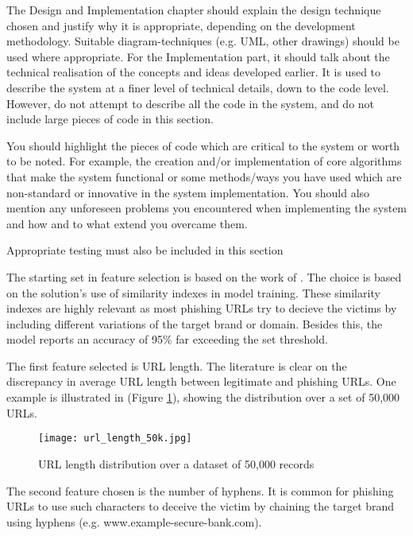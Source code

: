 	The Design and Implementation chapter should explain the design technique chosen and justify why it is appropriate, depending on the development methodology.  Suitable diagram-techniques (e.g. UML, other drawings) should be used where appropriate. For the Implementation part, it should talk about the technical realisation of the concepts and ideas developed earlier. It is used to describe the system at a finer level of technical details, down to the code level. However, do not attempt to describe all the code in the system, and do not include large pieces of code in this section.

	You should highlight the pieces of code which are critical to the system or worth to be noted. For example, the creation and/or implementation of core algorithms that make the system functional or some methods/ways you have used which are non-standard or innovative in the system implementation. You should also mention any unforeseen problems you encountered when implementing the system and how and to what extend you overcame them.

	Appropriate testing must also be included in this section







	The starting set in feature selection is based on the work of \cite{SVM_SIMILARITY_INDEX}. The choice is based on the solution's use of similarity indexes in model training. These similarity indexes are highly relevant as most phishing URLs try to decieve the victims by including different variations of the target brand or domain. Besides this, the model reports an accuracy of 95\% far exceeding the set threshold.

	The first feature selected is URL length. The literature is clear on the discrepancy in average URL length between legitimate and phishing URLs. One example is illustrated in \cite{STACKED_ML_URL_HTML} (Figure \ref{fig:URL_LENGTH_DISTRIBUTION}), showing the distribution over a set of 50,000 URLs.

	\begin{figure}[t]
		\centering
		\texttt{[image: url\_length\_50k.jpg]}
		\caption{URL length distribution over a dataset of 50,000 records}
		\label{fig:URL_LENGTH_DISTRIBUTION}
	\end{figure}

	The second feature chosen is the number of hyphens. It is common for phishing URLs to use such characters to deceive the victim by chaining the target brand using hyphens (e.g. www.example-secure-bank.com).

